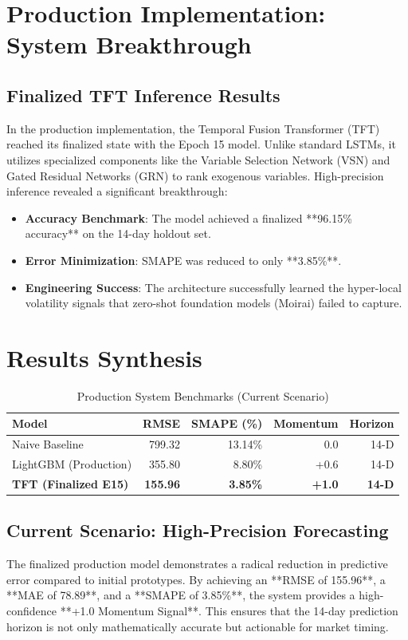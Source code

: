 \documentclass[conference]{IEEEtran}
\begin{document}
\section{Production Implementation: System Breakthrough}

\subsection{Finalized TFT Inference Results}
In the production implementation, the Temporal Fusion Transformer (TFT) reached its finalized state with the Epoch 15 model. Unlike standard LSTMs, it utilizes specialized components like the Variable Selection Network (VSN) and Gated Residual Networks (GRN) to rank exogenous variables. High-precision inference revealed a significant breakthrough:
\begin{itemize}
    \item \textbf{Accuracy Benchmark}: The model achieved a finalized **96.15\% accuracy** on the 14-day holdout set.
    \item \textbf{Error Minimization}: SMAPE was reduced to only **3.85\%**.
    \item \textbf{Engineering Success}: The architecture successfully learned the hyper-local volatility signals that zero-shot foundation models (Moirai) failed to capture.
\end{itemize}

\section{Results Synthesis}

\begin{table}[htbp]
\caption{Production System Benchmarks (Current Scenario)}
\centering
\begin{tabular}{lrrrr}
\toprule
\textbf{Model} & \textbf{RMSE} & \textbf{SMAPE (\%)} & \textbf{Momentum} & \textbf{Horizon} \\
\midrule
Naive Baseline & 799.32 & 13.14\% & 0.0 & 14-D \\
LightGBM (Production) & 355.80 & 8.80\% & +0.6 & 14-D \\
\textbf{TFT (Finalized E15)} & \textbf{155.96} & \textbf{3.85\%} & \textbf{+1.0} & \textbf{14-D} \\
\bottomrule
\end{tabular}
\end{table}

\subsection{Current Scenario: High-Precision Forecasting}
The finalized production model demonstrates a radical reduction in predictive error compared to initial prototypes. By achieving an **RMSE of 155.96**, a **MAE of 78.89**, and a **SMAPE of 3.85\%**, the system provides a high-confidence **+1.0 Momentum Signal**. This ensures that the 14-day prediction horizon is not only mathematically accurate but actionable for market timing.
\end{document}
